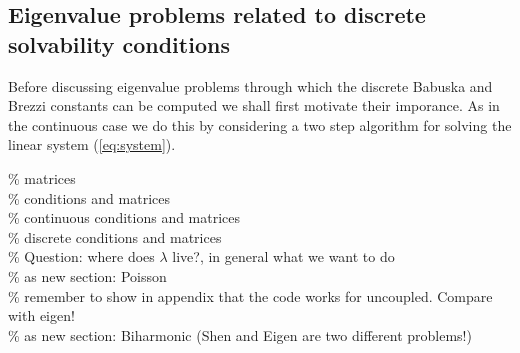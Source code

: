 \documentclass[a4paper,10pt]{article}
\begin{document}
  \subsection{Eigenvalue problems related to discrete solvability conditions}
  Before discussing eigenvalue problems through which the discrete Babuska
  and Brezzi constants can be computed we shall first motivate their imporance.
  As in the continuous case we do this by considering a two step algorithm
  for solving the linear system (\ref{eq:system}).



  \% matrices \\
  \% conditions and matrices \\
  \% continuous conditions and matrices \\
  \% discrete conditions and matrices \\
  \% Question: where does $\lambda$ live?, in general what we want to do \\
  \% as new section: Poisson\\
  \% remember to show in appendix that the code works for uncoupled. Compare
  with eigen!\\
  \% as new section: Biharmonic (Shen and Eigen are two different problems!)
  



  
  
\end{document}
